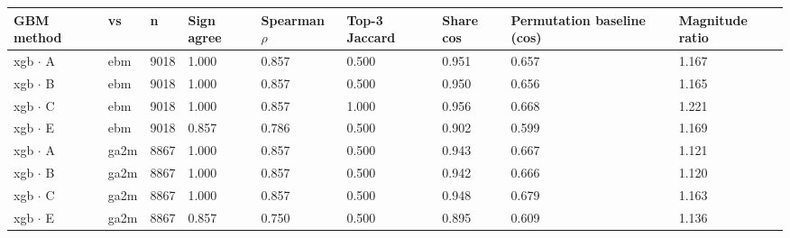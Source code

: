 \begin{tabular}{lllllllll}
\hline
GBM method & vs & n & Sign agree & Spearman $\rho$ & Top-3 Jaccard & Share cos & Permutation baseline (cos) & Magnitude ratio \\
\hline
xgb $\cdot$ A & ebm & 9018 & 1.000 & 0.857 & 0.500 & 0.951 & 0.657 & 1.167 \\
xgb $\cdot$ B & ebm & 9018 & 1.000 & 0.857 & 0.500 & 0.950 & 0.656 & 1.165 \\
xgb $\cdot$ C & ebm & 9018 & 1.000 & 0.857 & 1.000 & 0.956 & 0.668 & 1.221 \\
xgb $\cdot$ E & ebm & 9018 & 0.857 & 0.786 & 0.500 & 0.902 & 0.599 & 1.169 \\
xgb $\cdot$ A & ga2m & 8867 & 1.000 & 0.857 & 0.500 & 0.943 & 0.667 & 1.121 \\
xgb $\cdot$ B & ga2m & 8867 & 1.000 & 0.857 & 0.500 & 0.942 & 0.666 & 1.120 \\
xgb $\cdot$ C & ga2m & 8867 & 1.000 & 0.857 & 0.500 & 0.948 & 0.679 & 1.163 \\
xgb $\cdot$ E & ga2m & 8867 & 0.857 & 0.750 & 0.500 & 0.895 & 0.609 & 1.136 \\
\hline
\end{tabular}
